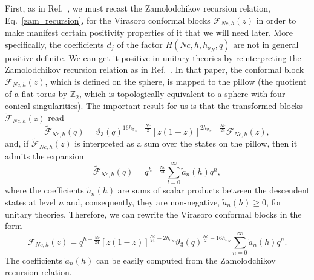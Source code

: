 \documentclass[a4paper,11pt]{article}
\begin{document}
First, as in Ref.~\cite{Collier}, we must recast the Zamolodchikov recursion relation, Eq.~\eqref{zam_recursion}, 
for the Virasoro conformal blocks $\mathcal{F}_{Nc, h}(z)$ in order to make manifest 
certain positivity properties of it that we will need later. More specifically, the 
coefficients $d_j$ of the factor $H(Nc, h, h_{\sigma_N}, q)$ are not in general positive
definite. We can get it positive in unitary theories by reinterpreting the Zamolodchikov recursion
relation as in Ref.~\cite{Maldacena}. In that paper, the conformal block $\mathcal{F}_{Nc, h}(z)$, 
which is defined on the sphere, is mapped to the pillow (the quotient of a flat torus
by $\mathbb{Z}_2$, which is topologically equivalent to a sphere with four conical singularities). 
The important result for us is that the transformed blocks $\tilde{\mathcal{F}}_{Nc, h}(z)$ read 
\begin{equation}
 \tilde{\mathcal{F}}_{Nc, h}(q)=\mathcal{\vartheta}_3(q)^{16h_{\sigma_N}-\frac{Nc}{2}}
 \left[z(1-z)\right]^{2h_{\sigma_N}-\frac{Nc}{24}}\mathcal{F}_{Nc, h}(z),
\end{equation}
and, if $\tilde{\mathcal{F}}_{Nc, h}(z)$ is interpreted as a sum over the states on the pillow, 
then it admits the expansion
\begin{equation}
 \tilde{\mathcal{F}}_{Nc, h}(q)=q^{h-\frac{Nc}{24}}\sum_{l=0}^\infty \tilde{a}_n(h) q^{n},
\end{equation}
where the coefficients $\tilde{a}_n(h)$ are sums of scalar products between the descendent states at level $n$ 
and, consequently, they are non-negative, $\tilde{a}_n(h)\geq 0$, for unitary theories. Therefore, we 
can rewrite the Virasoro conformal blocks in the form
\begin{equation}\label{Vir_cb_pillow}
 \mathcal{F}_{Nc, h}(z)=q^{h-\frac{Nc}{24}}\left[z(1-z)\right]^{\frac{Nc}{24}-2h_{\sigma_N}}
 \vartheta_3(q)^{\frac{Nc}{2}-16h_{\sigma_N}}\sum_{n=0}^\infty \tilde{a}_n(h) q^n.
\end{equation}
The coefficients $\tilde{a}_n(h)$ can be easily computed from the Zamolodchikov recursion relation.
\end{document}
